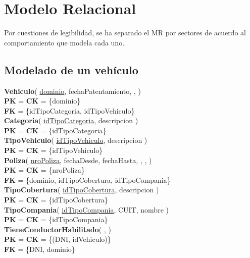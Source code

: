 \section{Modelo Relacional}
\small

Por cuestiones de legibilidad, se ha separado el MR por sectores de acuerdo
    al comportamiento que modela cada uno.

\subsection{Modelado de un vehículo}

\textbf{Vehiculo}(
    \uline{dominio},
    fechaPatentamiento,
    ,
)\\
\textbf{PK} = \textbf{CK} = \{dominio\}\\
\textbf{FK} = \{idTipoCategoria, idTipoVehiculo\}\\

\textbf{Categoria}(
    \uline{idTipoCategoria},
    descripcion
)\\
\textbf{PK} = \textbf{CK} = \{idTipoCategoria\}\\

\textbf{TipoVehiculo}(
    \uline{idTipoVehiculo},
    descripcion
)\\
\textbf{PK} = \textbf{CK} = \{idTipoVehiculo\}\\

\textbf{Poliza}(
    \uline{nroPoliza},
    fechaDesde,
    fechaHasta,
    ,
    ,
)\\
\textbf{PK} = \textbf{CK} = \{nroPoliza\}\\
\textbf{FK} = \{dominio, idTipoCobertura, idTipoCompania\}\\

\textbf{TipoCobertura}(
    \uline{idTipoCobertura},
    descripcion
)\\
\textbf{PK} = \textbf{CK} = \{idTipoCobertura\}\\

\textbf{TipoCompania}(
    \uline{idTipoCompania},
    CUIT,
    nombre
)\\
\textbf{PK} = \textbf{CK} = \{idTipoCompania\}\\

\textbf{TieneConductorHabilitado}(
    \uline{},
    \uline{}
)\\
\textbf{PK} = \textbf{CK} = \{(DNI, idVehiculo)\}\\
\textbf{FK} = \{DNI, dominio\}



